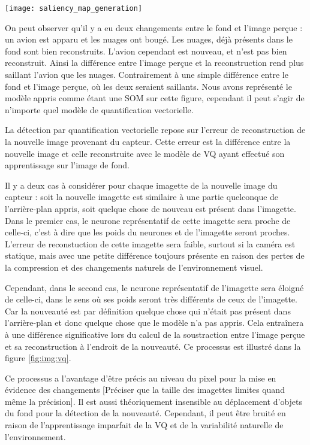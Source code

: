 	\begin{figureth}
		\texttt{[image: saliency\_map\_generation]}
		\caption[Détection de nouveauté par quantification vectorielle]{On peut observer qu'il y a eu deux changements entre le fond et l'image perçue : un avion est apparu et les nuages ont bougé. Les nuages, déjà présents dans le fond sont bien reconstruits. L'avion cependant est nouveau, et n'est pas bien reconstruit. Ainsi la différence entre l'image perçue et la reconstruction rend plus saillant l'avion que les nuages. Contrairement à une simple différence entre le fond et l'image perçue, où les deux seraient saillants. Nous avons représenté le modèle appris comme étant une SOM sur cette figure, cependant il peut s'agir de n'importe quel modèle de quantification vectorielle.}\label{fig:img:vq}
	\end{figureth}

	La détection par quantification vectorielle repose sur l'erreur de reconstruction de la nouvelle image provenant du capteur. Cette erreur est la différence entre la nouvelle image et celle reconstruite avec le modèle de VQ ayant effectué son apprentissage sur l'image de fond.

	Il y a deux cas à considérer pour chaque imagette de la nouvelle image du capteur : soit la nouvelle imagette est similaire à une partie quelconque de l'arrière-plan appris, soit quelque chose de nouveau est présent dans l'imagette. Dans le premier cas, le neurone représentatif de cette imagette sera proche de celle-ci, c'est à dire que les poids du neurones et de l'imagette seront proches. L'erreur de reconstuction de cette imagette sera faible, surtout si la caméra est statique, mais avec une petite différence toujours présente en raison des pertes de la compression et des changements naturels de l'environnement visuel.
	
	Cependant, dans le second cas, le neurone représentatif de l'imagette sera éloigné de celle-ci, dans le sens où ses poids seront très différents de ceux de l'imagette. Car la nouveauté est par définition quelque chose qui n'était pas présent dans l'arrière-plan et donc quelque chose que le modèle n'a pas appris. Cela entraînera à une différence significative lors du calcul de la soustraction entre l'image perçue et sa reconstruction à l'endroit de la nouveauté. Ce processus est illustré dans la figure \ref{fig:img:vq}. 

	Ce processus a l'avantage d'être précis au niveau du pixel pour la mise en évidence des changements [Préciser que la taille des imagettes limites quand même la précision]. Il est aussi théoriquement insensible au déplacement d'objets du fond pour la détection de la nouveauté. Cependant, il peut être bruité en raison de l'apprentissage imparfait de la VQ et de la variabilité naturelle de l'environnement.

